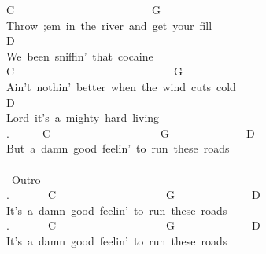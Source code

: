 {C\ \ \ \ \ \ \ \ \ \ \ \ \ \ \ \ \ \ \ \ \ \ \ \ \ G\\
Throw\ ;em\ in\ the\ river\ and\ get\ your\ fill\\
D\\
We\ been\ sniffin'\ that\ cocaine\\
C\ \ \ \ \ \ \ \ \ \ \ \ \ \ \ \ \ \ \ \ \ \ \ \ \ \ \ \ \ G\\
Ain't\ nothin'\ better\ when\ the\ wind\ cuts\ cold\\
D\\
Lord\ it's\ a\ mighty\ hard\ living\ \\
.\ \ \ \ \ \ C\ \ \ \ \ \ \ \ \ \ \ \ \ \ \ \ \ \ \ \ G\ \ \ \ \ \ \ \ \ \ \ \ \ \ D\\
But\ a\ damn\ good\ feelin'\ to\ run\ these\ roads\\
\\
\lbrack\ Outro\rbrack\\
.\ \ \ \ \ \ \ C\ \ \ \ \ \ \ \ \ \ \ \ \ \ \ \ \ \ \ \ G\ \ \ \ \ \ \ \ \ \ \ \ \ \ D\\
It's\ a\ damn\ good\ feelin'\ to\ run\ these\ roads\\
.\ \ \ \ \ \ \ C\ \ \ \ \ \ \ \ \ \ \ \ \ \ \ \ \ \ \ \ G\ \ \ \ \ \ \ \ \ \ \ \ \ \ D\\
It's\ a\ damn\ good\ feelin'\ to\ run\ these\ roads}
